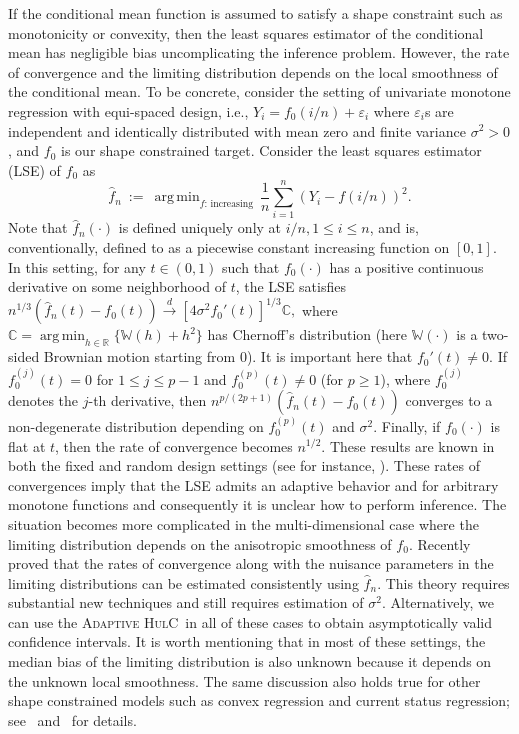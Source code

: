 \documentclass{article}
\newcommand{\ahulc}{\textsc{Adaptive HulC}~}
\numberwithin{myalgctr}{section}
\DeclareMathOperator*{\argmin}{arg\,min}
\begin{document}
If the conditional mean function is assumed to satisfy a shape constraint such as monotonicity or convexity, then the least squares estimator of the conditional mean has negligible bias uncomplicating the inference problem. However, the rate of convergence and the limiting distribution depends on the local smoothness of the conditional mean. To be concrete, consider the setting of univariate monotone regression with equi-spaced design, i.e., $Y_i = f_0(i/n) + \varepsilon_i$ where $\varepsilon_i$s are independent and identically distributed with mean zero and finite variance $\sigma^2 > 0$, and $f_0$ is our shape constrained target. Consider the least squares estimator (LSE) of $f_0$ as
\[
\widehat{f}_n ~:=~ \argmin_{f:\,\mbox{increasing}}\,\frac{1}{n}\sum_{i=1}^n (Y_i - f(i/n))^2.
\]
Note that $\widehat{f}_n(\cdot)$ is defined uniquely only at $i/n, 1\le i\le n$, and is, conventionally, defined to as a piecewise constant increasing function on $[0, 1]$. 
In this setting, for any $t\in(0, 1)$ such that $f_0(\cdot)$ has a positive continuous derivative on some neighborhood of $t$, the LSE satisfies
$n^{1/3}(\widehat{f}_n(t) - f_0(t)) \overset{d}{\to} [4\sigma^2f_0'(t)]^{1/3}\mathbb{C},$
where $\mathbb{C} = \argmin_{h\in\mathbb{R}}\{\mathbb{W}(h) + h^2\}$ has Chernoff's distribution (here $\mathbb{W}(\cdot)$ is a two-sided Brownian motion starting from $0$). It is important here that $f_0'(t) \neq 0$. If $f_0^{(j)}(t) = 0$ for $1\le j\le p-1$ and $f_0^{(p)}(t) \neq 0$ (for $p\ge1$), where $f_0^{(j)}$ denotes the $j$-th derivative, then $n^{p/(2p + 1)}(\widehat{f}_n(t) - f_0(t))$ converges to a non-degenerate distribution depending on $f^{(p)}_0(t)$ and $\sigma^2$. Finally, if $f_0(\cdot)$ is flat at $t$, then the rate of convergence becomes $n^{1/2}$. These results are known in both the fixed and random design settings (see for instance, \cite{wright1981asymptotic, durot2008monotone,guntuboyina2018nonparametric}).
These rates of convergences imply that the LSE admits an adaptive behavior and for arbitrary monotone functions and consequently it is unclear how to perform inference. The situation becomes more complicated in the multi-dimensional case where the limiting distribution depends on the anisotropic smoothness of $f_0$. Recently~\cite{deng2020confidence} proved that the rates of convergence along with the nuisance parameters in the limiting distributions can be estimated consistently using $\widehat{f}_n$. This theory requires substantial new techniques and still requires estimation of $\sigma^2$. Alternatively, we can use the \ahulc in all of these cases to obtain asymptotically valid confidence intervals. It is worth mentioning that in most of these settings, the median bias of the limiting distribution is also unknown because it depends on the unknown local smoothness. The same discussion also holds true for other shape constrained models such as convex regression and current status regression; see~\citet[Section 4]{guntuboyina2018nonparametric} and~\cite{deng2020inference} for details.
\end{document}
